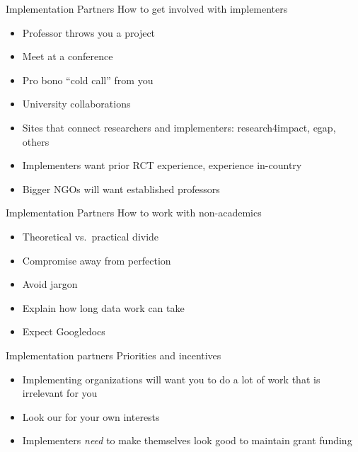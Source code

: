 \documentclass[
  ignorenonframetext,
]{beamer}
\providecommand{\tightlist}{%
  \setlength{\itemsep}{0pt}\setlength{\parskip}{0pt}}
\begin{document}
\begin{frame}{Implementation Partners}
\protect\hypertarget{implementation-partners}{}
How to get involved with implementers

\begin{itemize}
\item
  Professor throws you a project
\item
  Meet at a conference
\item
  Pro bono ``cold call'' from you
\item
  University collaborations
\item
  Sites that connect researchers and implementers: research4impact,
  egap, others
\item
  Implementers want prior RCT experience, experience in-country
\item
  Bigger NGOs will want established professors
\end{itemize}
\end{frame}

\begin{frame}{Implementation Partners}
\protect\hypertarget{implementation-partners-1}{}
How to work with non-academics

\begin{itemize}
\tightlist
\item
  Theoretical vs.~practical divide
\item
  Compromise away from perfection
\item
  Avoid jargon
\item
  Explain how long data work can take
\item
  Expect Googledocs
\end{itemize}
\end{frame}

\begin{frame}{Implementation partners}
\protect\hypertarget{implementation-partners-2}{}
Priorities and incentives

\begin{itemize}
\tightlist
\item
  Implementing organizations will want you to do a lot of work that is
  irrelevant for you
\item
  Look our for your own interests
\item
  Implementers \emph{need} to make themselves look good to maintain
  grant funding
\end{itemize}
\end{frame}
\end{document}
